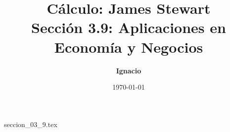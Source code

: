 \documentclass[11pt,spanish,oneside]{report}
\title{\textbf{Cálculo: James Stewart} \\ \Large Sección 3.9: Aplicaciones en Economía y Negocios}
\author{\textbf{Ignacio}}
\date{\today}
\begin{document}
\maketitle

{seccion_03_9.tex}
\end{document}
